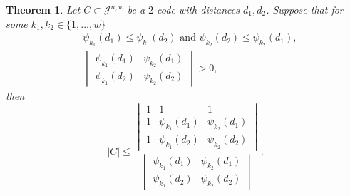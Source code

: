 \documentclass{amsart}
\newtheorem{theoremenv}[definitionenv]{Theorem}
\newenvironment{theorem}{\begin{theoremenv}\rm}{\end{theoremenv}}
\newcommand{\cJ}{\mathcal{J}}
\begin{document}
\begin{theorem}\label{thm:Joh_lp_2}
Let $C \subset \cJ^{n, w}$ be a $2$-code with distances $d_1, d_2$. Suppose that for some $k_1,k_2\in\{1,\dots,w\}$
   \begin{align}
&\text{$\psi_{k_1}(d_1) \leq \psi_{k_1}(d_2)$ and $\psi_{k_2}(d_2) \leq \psi_{k_2}(d_1)$,}\label{eq:am1}\\
&\text{$\begin{vmatrix} \psi_{k_1}(d_1) & \psi_{k_2}(d_1) \\ \psi_{k_1}(d_2) & \psi_{k_2}(d_2) \end{vmatrix} > 0$,}\label{eq:am2}
\end{align}
then
\begin{equation}\label{eq:B2}
    |C| \leq \frac{\begin{vmatrix} 1 & 1 & 1 \\ 1 & \psi_{k_1}(d_1) & \psi_{k_2}(d_1) \\ 1 & \psi_{k_1}(d_2) & \psi_{k_2}(d_2) \end{vmatrix}}{\begin{vmatrix} \psi_{k_1}(d_1) & \psi_{k_2}(d_1) \\ \psi_{k_1}(d_2) & \psi_{k_2}(d_2) \end{vmatrix}}.
\end{equation}
\end{theorem}
\end{document}
